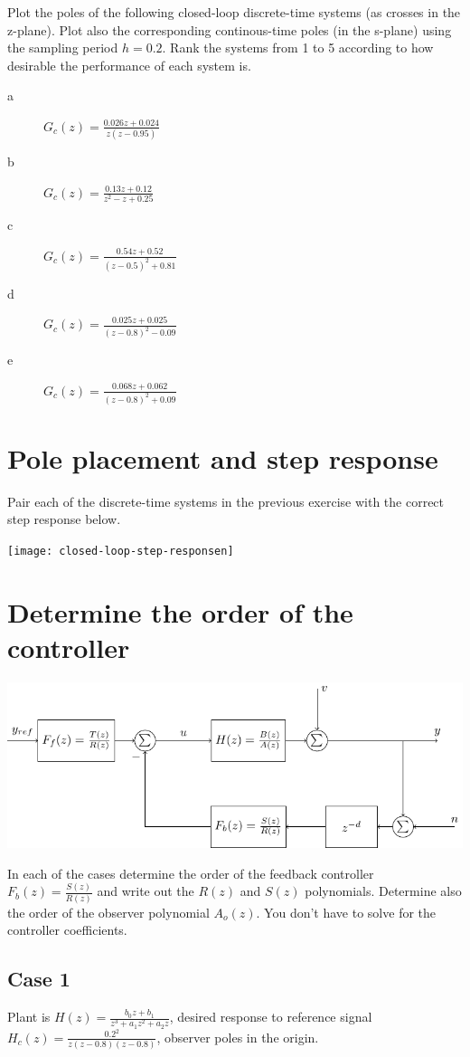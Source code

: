 \documentclass[letterpaper,fleqn]{scrartcl}
\begin{document}
Plot the poles of the following closed-loop discrete-time systems (as crosses in the z-plane). Plot also the corresponding continous-time poles (in the s-plane) using the sampling period \(h=0.2\). Rank the systems from 1 to 5 according to how desirable the performance of each system is.
\begin{description}
\item[{a}] \( G_c(z) = \frac{0.026z + 0.024}{z(z-0.95)}\)
\item[{b}] \( G_c(z) = \frac{0.13z + 0.12}{z^2 - z + 0.25} \)
\item[{c}] \(G_c(z) = \frac{0.54z + 0.52}{(z-0.5)^2 + 0.81}\)
\item[{d}] \(G_c(z) = \frac{0.025z + 0.025}{(z-0.8)^2 - 0.09}\)
\item[{e}] \(G_c(z) = \frac{0.068z + 0.062}{(z-0.8)^2 + 0.09}\)
\end{description}

\section*{Pole placement and step response}
\label{sec-2}
Pair each of the discrete-time systems in the previous exercise with the correct step response below.
\begin{center}
\texttt{[image: closed-loop-step-responsen]}
\end{center}

\section*{Determine the order of the controller}
\label{sec-3}
\begin{center}
\includegraphics[width=0.7\linewidth]{../figures/2dof-block-explicit}
\end{center}
In each of the cases determine the order of the feedback controller $F_{b}(z)=\frac{S(z)}{R(z)}$ and write out the $R(z)$ and $S(z)$ polynomials. Determine also the order of the observer polynomial $A_o(z)$. You don't have to solve for the controller coefficients.

\subsection*{Case 1}
\label{sec-3-1}
Plant is \(H(z) = \frac{b_0z+b_1}{z^3  + a_1z^2 + a_2z}\),  desired response to reference signal \(H_c(z) = \frac{0.2^2}{z(z-0.8)(z-0.8)}\), observer poles in the origin.
\end{document}
